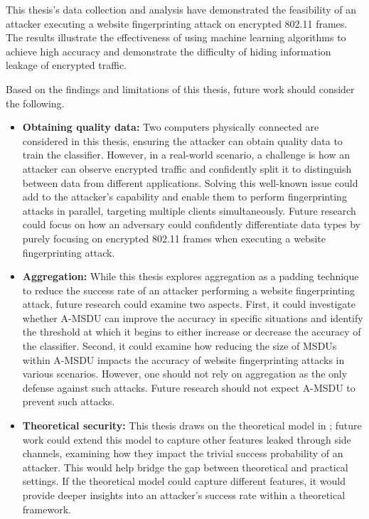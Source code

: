 This thesis's data collection and analysis have demonstrated the feasibility of an attacker executing a website fingerprinting attack on encrypted 802.11 frames. The results illustrate the effectiveness of using machine learning algorithms to achieve high accuracy and demonstrate the difficulty of hiding information leakage of encrypted traffic.

Based on the findings and limitations of this thesis, future work should consider the following.

\begin{itemize}
	\item{\textbf{Obtaining quality data:}} Two computers physically connected are considered in this thesis, ensuring the attacker can obtain quality data to train the classifier. However, in a real-world scenario, a challenge is how an attacker can observe encrypted traffic and confidently split it to distinguish between data from different applications. Solving this well-known issue could add to the attacker's capability and enable them to perform fingerprinting attacks in parallel, targeting multiple clients simultaneously. Future research could focus on how an adversary could confidently differentiate data types by purely focusing on encrypted 802.11 frames when executing a website fingerprinting attack. 
	
	\item{\textbf{Aggregation:}} While this thesis explores aggregation as a padding technique to reduce the success rate of an attacker performing a website fingerprinting attack, future research could examine two aspects. First, it could investigate whether A-MSDU can improve the accuracy in specific situations and identify the threshold at which it begins to either increase or decrease the accuracy of the classifier. Second, it could examine how reducing the size of MSDUs within A-MSDU impacts the accuracy of website fingerprinting attacks in various scenarios. However, one should not rely on aggregation as the only defense against such attacks. Future research should not expect A-MSDU to prevent such attacks.
	
	\item{\textbf{Theoretical security:}} This thesis draws on the theoretical model in \cite{DBLP:conf/ctrsa/GellertJLN22}; future work could extend this model to capture other features leaked through side channels, examining how they impact the trivial success probability of an attacker. This would help bridge the gap between theoretical and practical settings. If the theoretical model could capture different features, it would provide deeper insights into an attacker's success rate within a theoretical framework.
\end{itemize}

\clearpage